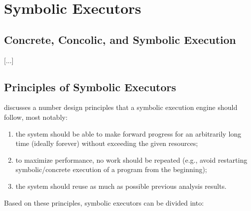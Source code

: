 
\section{Symbolic Executors}
\label{se:executors}

\subsection{Concrete, Concolic, and Symbolic Execution}
\label{ss:concrete-concolic-symbolic}

[...]

\subsection{Principles of Symbolic Executors}
\label{ss:principles}

\cite{MAYHEM-SP12} discusses a number design principles that a symbolic execution engine should follow, most notably: 
\begin{enumerate}
  \item the system should be able to make forward progress for an arbitrarily long time (ideally forever) without exceeding the given resources;
  \item to maximize performance, no work should be repeated (e.g., avoid restarting symbolic/concrete execution of a program from the beginning);
  \item the system should reuse as much as possible previous analysis results.
\end{enumerate}

\noindent Based on these principles, symbolic executors can be divided into:

